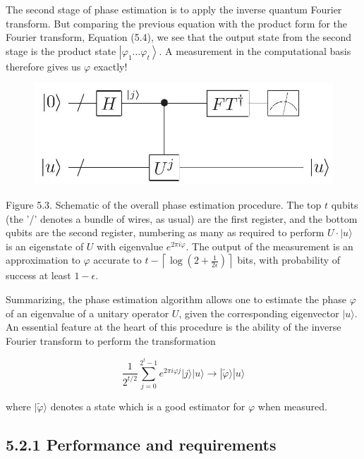 The second stage of phase estimation is to apply the inverse quantum Fourier transform. But comparing the previous equation with the product form for the Fourier transform, Equation (5.4), we see that the output state from the second stage is the product state $\left|\varphi_{1} \ldots \varphi_{t}\right\rangle$. A measurement in the computational basis therefore gives us $\varphi$ exactly!

\begin{figure}
\centering
\includegraphics[width=0.75\linewidth]{Images/2024_05_17_6977ce60de6fd27aef98g-257}
\end{figure}

Figure 5.3. Schematic of the overall phase estimation procedure. The top $t$ qubits (the '/' denotes a bundle of wires, as usual) are the first register, and the bottom qubits are the second register, numbering as many as required to perform $U \cdot|u\rangle$ is an eigenstate of $U$ with eigenvalue $e^{2 \pi i \varphi}$. The output of the measurement is an approximation to $\varphi$ accurate to $t-\left\lceil\log \left(2+\frac{1}{2 \epsilon}\right)\right\rceil$ bits, with probability of success at least $1-\epsilon$.

Summarizing, the phase estimation algorithm allows one to estimate the phase $\varphi$ of an eigenvalue of a unitary operator $U$, given the corresponding eigenvector $|u\rangle$. An essential feature at the heart of this procedure is the ability of the inverse Fourier transform to perform the transformation

\begin{equation*}
\frac{1}{2^{t / 2}} \sum_{j=0}^{2^{t}-1} e^{2 \pi i \varphi j}|j\rangle|u\rangle \rightarrow|\tilde{\varphi}\rangle|u\rangle \tag{5.22}
\end{equation*}

where $|\tilde{\varphi}\rangle$ denotes a state which is a good estimator for $\varphi$ when measured.

\subsection*{5.2.1 Performance and requirements}

